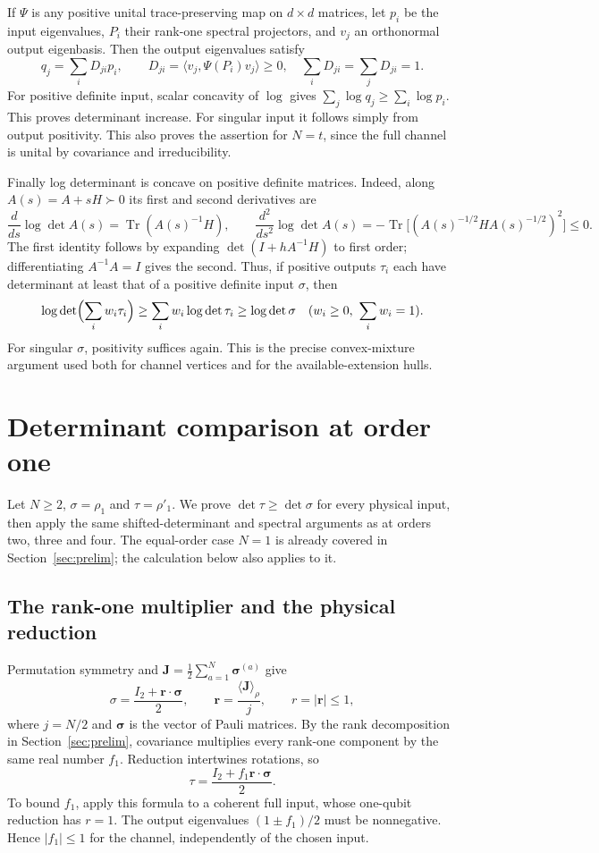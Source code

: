\documentclass[11pt,a4paper]{article}
\begin{document}
If $\Psi$ is any positive unital trace-preserving map on $d\times d$
matrices, let $p_i$ be the input eigenvalues, $P_i$ their rank-one
spectral projectors, and $v_j$ an orthonormal output eigenbasis.
Then the output eigenvalues satisfy
\[
 q_j=\sum_iD_{ji}p_i,\qquad
 D_{ji}=\langle v_j,\Psi(P_i)v_j\rangle\ge0,
 \quad \sum_iD_{ji}=\sum_jD_{ji}=1.
\]
For positive definite input, scalar concavity of $\log$ gives
$\sum_j\log q_j\ge\sum_i\log p_i$. This proves determinant increase.
For singular input it follows simply from output positivity.
This also proves the assertion for $N=t$, since the full channel is
unital by covariance and irreducibility.

Finally log determinant is concave on positive definite matrices.
Indeed, along $A(s)=A+sH\succ0$ its first and second derivatives are
\[
 \frac{d}{ds}\log\det A(s)=\operatorname{Tr}(A(s)^{-1}H),\qquad
 \frac{d^2}{ds^2}\log\det A(s)
 =-\operatorname{Tr}\bigl[(A(s)^{-1/2}HA(s)^{-1/2})^2\bigr]\le0.
\]
The first identity follows by expanding $\det(I+hA^{-1}H)$ to first
order; differentiating $A^{-1}A=I$ gives the second.
Thus, if positive outputs $\tau_i$ each have determinant at least that
of a positive definite input $\sigma$, then
\[
 \log\det\Bigl(\sum_iw_i\tau_i\Bigr)
 \ge\sum_iw_i\log\det\tau_i\ge\log\det\sigma
 \quad(w_i\ge0,\ \sum_iw_i=1).
\]
For singular $\sigma$, positivity suffices again. This is the precise
convex-mixture argument used both for channel vertices and for the
available-extension hulls.

\clearpage
\section{Determinant comparison at order one}\label{sec:t1}
Let $N\ge2$, $\sigma=\rho_1$ and $\tau=\rho'_1$. We prove
$\det\tau\ge\det\sigma$ for every physical input, then apply the same
shifted-determinant and spectral arguments as at orders two, three and
four. The equal-order case $N=1$ is already covered in
Section~\ref{sec:prelim}; the calculation below also applies to it.

\subsection{The rank-one multiplier and the physical reduction}
Permutation symmetry and
$\mathbf J=\tfrac12\sum_{a=1}^N\boldsymbol\sigma^{(a)}$ give
\[
 \sigma=\frac{I_2+\mathbf r\cdot\boldsymbol\sigma}{2},\qquad
 \mathbf r=\frac{\langle\mathbf J\rangle_\rho}{j},\qquad
 r=|\mathbf r|\le1,
\]
where $j=N/2$ and $\boldsymbol\sigma$ is the vector of Pauli matrices.
By the rank decomposition in Section~\ref{sec:prelim}, covariance
multiplies every rank-one component by the same real number $f_1$.
Reduction intertwines rotations, so
\[
 \tau=\frac{I_2+f_1\mathbf r\cdot\boldsymbol\sigma}{2}.
\]
To bound $f_1$, apply this formula to a coherent full input, whose
one-qubit reduction has $r=1$. The output eigenvalues
$(1\pm f_1)/2$ must be nonnegative. Hence $|f_1|\le1$ for the channel,
independently of the chosen input.
\end{document}
